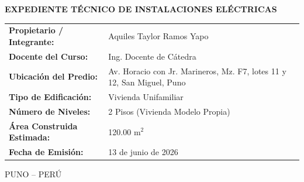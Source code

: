 \begin{titlepage}
\begin{minipage}{5.20in}
\vspace{0.40in}
{\fontsize{13}{16}\selectfont\bfseries EXPEDIENTE TÉCNICO DE INSTALACIONES ELÉCTRICAS\par}

\vspace{0.40in}
\begin{flushleft}
\fontsize{10}{13}\selectfont
\renewcommand{\arraystretch}{1.2}
\begin{tabular}{>{\bfseries}p{1.8in}p{3.05in}}
Propietario / Integrante: & Aquiles Taylor Ramos Yapo \\
Docente del Curso: & Ing. Docente de Cátedra \\
Ubicación del Predio: & Av. Horacio con Jr. Marineros, Mz. F7, lotes 11 y 12, San Miguel, Puno \\
Tipo de Edificación: & Vivienda Unifamiliar \\
Número de Niveles: & 2 Pisos (Vivienda Modelo Propia) \\
Área Construida Estimada: & 120.00 m\(^2\) \\
Fecha de Emisión: & 13 de junio de 2026 \\
\end{tabular}
\end{flushleft}

\vfill
{\fontsize{10}{12}\selectfont PUNO -- PERÚ\par}
{\fontsize{9}{11}\par}
\end{minipage}

\end{titlepage}
